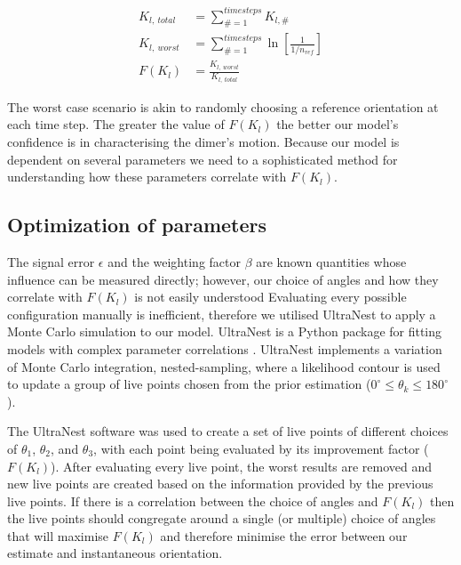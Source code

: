 \documentclass[final,  3p]{elsarticle}
\begin{document}
\begin{align}
K_{l, \ total} &= \sum\limits_{\# =1}^{timesteps} K_{l,\#} \\
K_{l, \ worst} &= \sum\limits_{\#=1}^{timesteps} \ln \left[\frac{1}{1/n_{ref}} \right] \\
F(K_l) &= \frac{K_{l,\ worst}}{K_{l, \ total}}
\end{align}

The worst case scenario is akin to randomly choosing a reference orientation at each time step. The greater the value of $F(K_l)$ the better our model's confidence is in characterising the dimer's motion. Because our model is dependent on several parameters we need to a sophisticated method for understanding how these parameters correlate with $F(K_l)$.


\subsection{Optimization of parameters}
\label{sec:ultranest}

The signal error $\epsilon$ and the weighting factor $\beta$ are known quantities whose influence can be measured directly; however, our choice of angles and how they correlate with $F(K_l)$ is not easily understood Evaluating every possible configuration manually is inefficient, therefore we utilised UltraNest to apply a Monte Carlo simulation to our model. UltraNest is a Python package for fitting models with complex parameter correlations \cite{Buchner2016Ultranest}. UltraNest implements a variation of Monte Carlo integration, nested-sampling, where a likelihood contour is used to update a group of live points chosen from the prior estimation ($0^{\circ} \leq \theta_k \leq 180^{\circ}$).

The UltraNest software was used to create a set of live points of different choices of $\theta_1$, $\theta_2$, and $\theta_3$, with each point being evaluated by its improvement factor ($F(K_l)$). After evaluating every live point, the worst results are removed and new live points are created based on the information provided by the previous live points. If there is a correlation between the choice of angles and $F(K_l)$ then the live points should congregate around a single (or multiple) choice of angles that will maximise $F(K_l)$ and therefore minimise the error between our estimate and instantaneous orientation.


\end{document}
